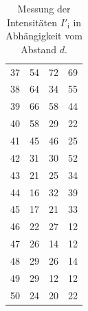 \begin{table}
\begin{tabular}{S S S S}
37&54&72&69\\
38&64&34&55\\
39&66&58&44\\
40&58&29&22\\
41&45&46&25\\
42&31&30&52\\
43&21&25&34\\
44&16& 32& 39\\
45&17&21& 33\\
46&22&27& 12\\
47&26&14& 12\\
48&29&26& 14\\
49&29&12& 12\\
50&24&20& 22\\
	\bottomrule
\end{tabular}
	\caption{Messung der Intensitäten $I'_\mathup{i}$ in Abhängigkeit vom Abstand $d$.}
	\label{tab:m}
\end{table}

